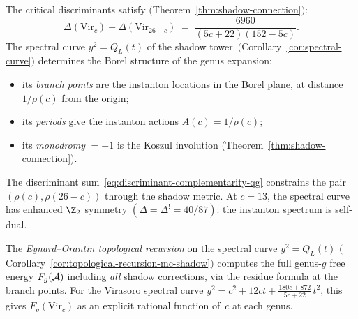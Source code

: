 \begin{remark}%
\label{rem:discriminant-instanton-duality}%
%
%
The critical discriminants satisfy
$($Theorem~\ref{thm:shadow-connection}$)$:
\begin{equation}\label{eq:discriminant-complementarity-qg}
\Delta(\mathrm{Vir}_c) + \Delta(\mathrm{Vir}_{26-c})
\;=\;
\frac{6960}{(5c+22)(152-5c)}.
\end{equation}
The spectral curve $y^2 = Q_L(t)$ of the shadow
tower~$($Corollary~\ref{cor:spectral-curve}$)$
determines the Borel structure of the genus expansion:
\begin{itemize}
\item its \emph{branch points} are the instanton
locations in the Borel plane, at distance
$1/\rho(c)$ from the origin;
\item its \emph{periods} give the instanton actions
$A(c) = 1/\rho(c)$;
\item its \emph{monodromy} $= -1$
is the Koszul involution
(Theorem~\ref{thm:shadow-connection}).
\end{itemize}
The discriminant
sum~\eqref{eq:discriminant-complementarity-qg}
constrains the pair $(\rho(c), \rho(26-c))$ through
the shadow metric. At $c = 13$, the spectral curve
has enhanced $\Z_2$ symmetry
$(\Delta = \Delta^! = 40/87)$:
the instanton spectrum is self-dual.

The \emph{Eynard--Orantin topological recursion}
on the spectral curve $y^2 = Q_L(t)$
$($Corollary~\ref{cor:topological-recursion-mc-shadow}$)$
computes the full genus-$g$ free energy $F_g(\mathcal{A})$
including \emph{all} shadow corrections, via the
residue formula at the branch points.
For the Virasoro spectral curve
$y^2 = c^2 + 12ct + \frac{180c+872}{5c+22}\,t^2$,
this gives $F_g(\mathrm{Vir}_c)$ as an explicit rational
function of~$c$ at each genus.
\end{remark}
